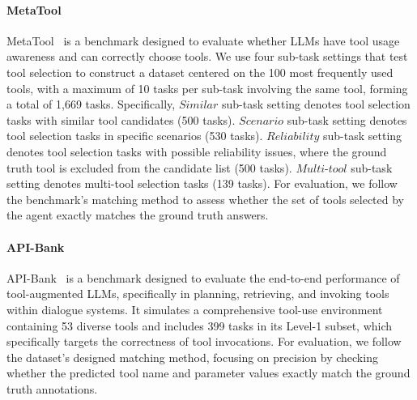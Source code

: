\documentclass[11pt]{article}
\begin{document}
\paragraph{MetaTool} MetaTool~\citep{metatool} is a benchmark designed to evaluate whether LLMs have tool usage awareness and can correctly choose tools. 
We use four sub-task settings that test tool selection to construct a dataset centered on the 100 most frequently used tools, with a maximum of 10 tasks per sub-task involving the same tool, forming a total of 1,669 tasks. Specifically, $\textit{Similar}$ sub-task setting denotes tool selection tasks with similar tool candidates (500 tasks). $\textit{Scenario}$ sub-task setting denotes tool selection tasks in specific scenarios (530 tasks). $\textit{Reliability}$ sub-task setting denotes tool selection tasks with possible reliability issues, where the ground truth tool is excluded from the candidate list (500 tasks). $\textit{Multi-tool}$ sub-task setting denotes multi-tool selection tasks (139 tasks). 
For evaluation, we follow the benchmark's matching method to assess whether the set of tools selected by the agent exactly matches the ground truth answers.


\paragraph{API-Bank} API-Bank~\citep{apibank} is a benchmark designed to evaluate the end-to-end performance of tool-augmented LLMs, specifically in planning, retrieving, and invoking tools within dialogue systems. 
It simulates a comprehensive tool-use environment containing 53 diverse tools and includes 399 tasks in its Level-1 subset, which specifically targets the correctness of tool invocations. 
For evaluation, we follow the dataset's designed matching method, focusing on precision by checking whether the predicted tool name and parameter values exactly match the ground truth annotations.
\end{document}
